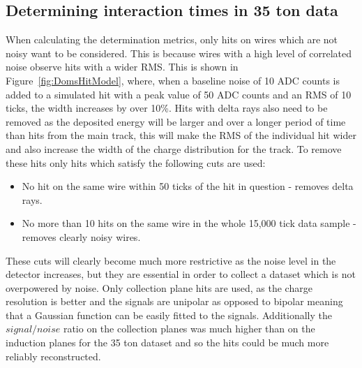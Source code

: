\subsection{Determining interaction times in 35 ton data}
When calculating the determination metrics, only hits on wires which are not noisy want to be considered. This is because wires with a high level of correlated noise observe hits with a wider RMS. This is shown in Figure~\ref{fig:DomsHitModel}, where, when a baseline noise of 10 ADC counts is added to a simulated hit with a peak value of 50 ADC counts and an RMS of 10 ticks, the width increases by over 10\%. Hits with delta rays also need to be removed as the deposited energy will be larger and over a longer period of time than hits from the main track, this will make the RMS of the individual hit wider and also increase the width of the charge distribution for the track. To remove these hits only hits which satisfy the following cuts are used:
\begin{itemize}
\item No hit on the same wire within 50 ticks of the hit in question - removes delta rays.
\item No more than 10 hits on the same wire in the whole 15,000 tick data sample - removes clearly noisy wires.
\end{itemize}
These cuts will clearly become much more restrictive as the noise level in the detector increases, but they are essential in order to collect a dataset which is not overpowered by noise. Only collection plane hits are used, as the charge resolution is better and the signals are unipolar as opposed to bipolar meaning that a Gaussian function can be easily fitted to the signals. Additionally the $signal/noise$ ratio on the collection planes was much higher than on the induction planes for the 35 ton dataset and so the hits could be much more reliably reconstructed. \\

